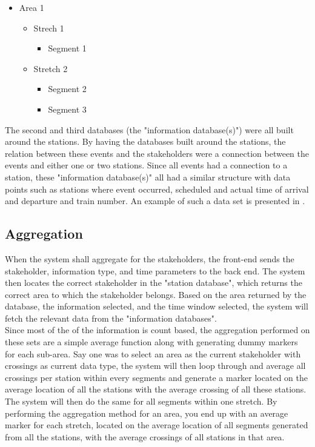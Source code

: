 \begin{itemize}
	\item Area 1
	\begin{itemize}
		\item Strech 1
		\begin{itemize}
			\item Segment 1
		\end{itemize}
		\item Stretch 2
		\begin{itemize}
			\item Segment 2
			\item Segment 3
		\end{itemize}
	\end{itemize}
\end{itemize}


The second and third databases (the "information database(s)") were all built
around the stations. By having the databases built around the stations, the 
relation between these events and the stakeholders were a connection between 
the events and either one or two stations. Since all events had a connection 
to a station, these "information database(s)" all had a similar structure with 
data points such as stations where event occurred, scheduled and actual time 
of arrival and departure and train number. An example of such a data set is 
presented in .


\subsection{Aggregation} %
\label{sub:back_end_aggregation}
When the system shall aggregate for the stakeholders, the front-end sends
the stakeholder, information type, and time parameters to the back end. 
The system then locates the correct stakeholder in the "station database",
which returns the correct area to which the stakeholder belongs. Based on the 
area returned by the database, the information selected, and the time window
selected, the system will fetch the relevant data from the "information 
databases". \\

Since most of the of the information is count based, the aggregation performed
on these sets are a simple average function along with generating dummy 
markers for each sub-area. Say one was to select an area as the current 
stakeholder with crossings as current data type, the system will then loop 
through and average all crossings per station within every segments and 
generate a marker located on the average location of all the stations with the 
average crossing of all these stations. The system will then do the same for 
all segments within one stretch. By performing the aggregation method for an 
area, you end up with an average marker for each stretch, located on the  
average location of all segments generated from all the stations, with the 
average crossings of all stations in that area.\\

